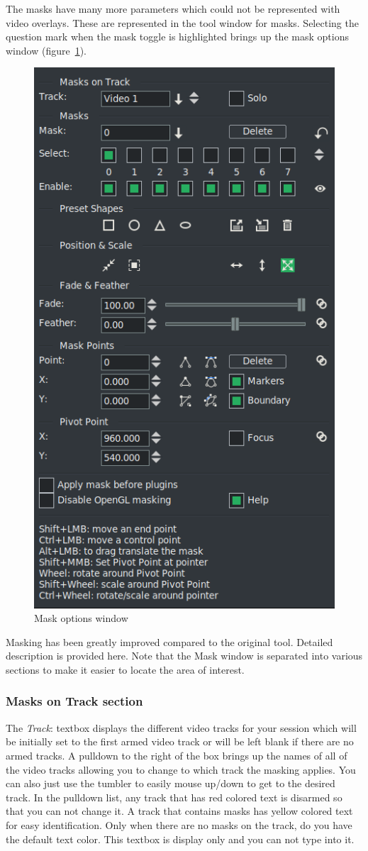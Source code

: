 The masks have many more parameters which could not be represented with video overlays. 
These are represented in the tool window for masks. 
Selecting the question mark when the mask toggle is highlighted brings up the mask options window (figure~\ref{fig:mask_window}).

\begin{figure}[htpb]
    \centering
    \includegraphics[width=0.5\linewidth]{images/mask_window.png}
    \caption{Mask options window}
    \label{fig:mask_window}
\end{figure}

Masking has been greatly improved compared to the original tool.  Detailed description is provided here.  Note that the Mask window is separated into various sections to make it easier to locate the area of interest.

\subsubsection*{Masks on Track section}%
\label{ssub:masks_track_section}

The \textit{Track}: textbox displays the different video tracks for your session which will be initially set to the first armed video track or will be left blank if there are no armed tracks.  A pulldown to the right of the box brings up the names of all of the video tracks allowing you to change to which track the masking applies.  You can also just use the tumbler to easily mouse up/down to get to the desired track. In the pulldown list, any track that has red colored text is disarmed so that you can not change it.  A track that contains masks has yellow colored text for easy identification.  Only when there are no masks on the track, do you have the default text color. This textbox is display only and you can not type into it.

